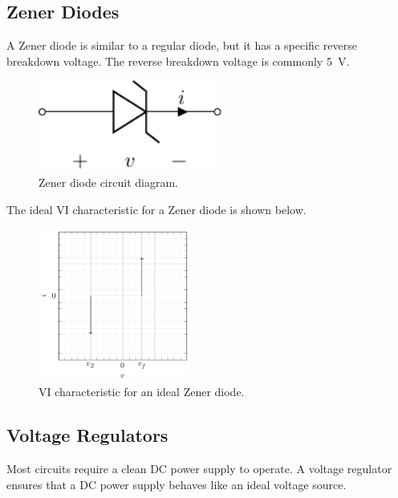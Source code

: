 \documentclass{article}
\begin{document}
\subsection{Zener Diodes}
A Zener diode is similar to a regular diode, but it has a specific
reverse breakdown voltage. The reverse breakdown voltage is commonly \qty{5}{V}.
\begin{figure}[H]
    \centering
    \includegraphics[height = 3cm, keepaspectratio = true]{figures/zener_diode.pdf}
    \caption{Zener diode circuit diagram.}
\end{figure}
The ideal VI characteristic for a Zener diode is shown below.
\begin{figure}[H]
    \centering
    \includegraphics[height = 5cm, keepaspectratio = true]{figures/vi_characteristic_zener_diode.pdf}
    \caption{VI characteristic for an ideal Zener diode.}
\end{figure}
\subsection{Voltage Regulators}
Most circuits require a clean DC power supply to operate.
A voltage regulator ensures that a DC power supply behaves like an ideal voltage source.
\end{document}
